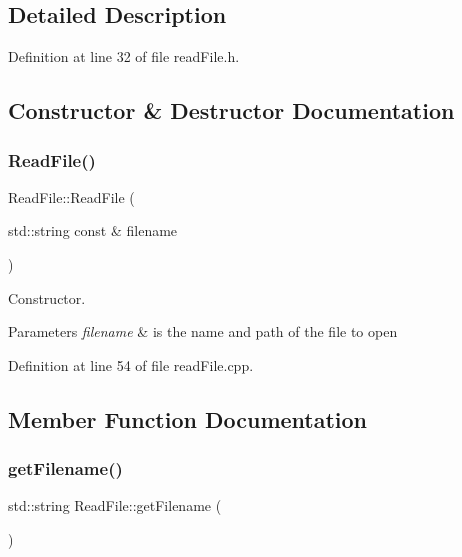 \subsection{Detailed Description}


Definition at line 32 of file read\+File.\+h.



\subsection{Constructor \& Destructor Documentation}
\mbox{\label{class_read_file_ae297f0539380fc9b703a1bceda2ce820}} 
\subsubsection{\texorpdfstring{Read\+File()}{ReadFile()}}
{\footnotesize\ttfamily Read\+File\+::\+Read\+File (\begin{DoxyParamCaption}\item[{std\+::string const \&}]{filename }\end{DoxyParamCaption})\hspace{0.3cm}{\ttfamily [explicit]}}



Constructor. 


\begin{DoxyParams}{Parameters}
{\em filename} & is the name and path of the file to open \\
\hline
\end{DoxyParams}


Definition at line 54 of file read\+File.\+cpp.



\subsection{Member Function Documentation}
\mbox{\label{class_read_file_a9835264c9ec95cfdbc1349573402fc01}} 
\subsubsection{\texorpdfstring{get\+Filename()}{getFilename()}}
{\footnotesize\ttfamily std\+::string Read\+File\+::get\+Filename (\begin{DoxyParamCaption}{ }\end{DoxyParamCaption})}



